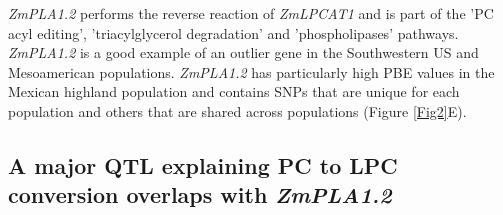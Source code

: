 \documentclass[9pt,twocolumn,twoside,lineno]{BioRxiv}
\begin{document}
\textit{ZmPLA1.2} performs the reverse reaction of \textit{ZmLPCAT1} and is part of the 'PC acyl editing', 'triacylglycerol degradation' and 'phospholipases' pathways. 
\textit{ZmPLA1.2} is a good example of an outlier gene in the Southwestern US and Mesoamerican populations.
\textit{ZmPLA1.2} has particularly high PBE values in the Mexican highland population and contains SNPs that are unique for each population and others that are shared across populations (Figure \ref{Fig2}E). 

\subsection{A major QTL explaining PC to LPC conversion overlaps with \textit{ZmPLA1.2}} 
\end{document}

